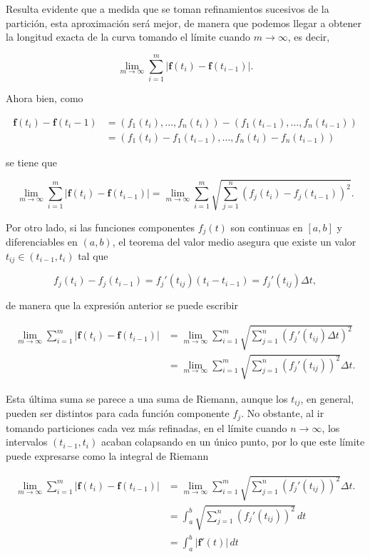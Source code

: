 \documentclass[
  a4paper,
]{scrreport}
\theoremstyle{definition}
\theoremstyle{plain}
\theoremstyle{plain}
\theoremstyle{definition}
\theoremstyle{plain}
\theoremstyle{remark}
\begin{document}
Resulta evidente que a medida que se toman refinamientos sucesivos de la
partición, esta aproximación será mejor, de manera que podemos llegar a
obtener la longitud exacta de la curva tomando el límite cuando
\(m\to\infty\), es decir,

\[
\lim_{m\to\infty}\sum_{i=1}^m |\mathbf{f}(t_i)-\mathbf{f}(t_{i-1})|.
\]

Ahora bien, como

\begin{align*}
\mathbf{f}(t_i)-\mathbf{f}(t_i-1) 
&= (f_1(t_i),\ldots,f_n(t_i))-(f_1(t_{i-1}),\ldots,f_n(t_{i-1})) \\
&= (f_1(t_i)-f_1(t_{i-1}),\ldots,f_n(t_i)-f_n(t_{i-1}))
\end{align*}

se tiene que

\[
\lim_{m\to\infty}\sum_{i=1}^m |\mathbf{f}(t_i)-\mathbf{f}(t_{i-1})| =
\lim_{m\to\infty}\sum_{i=1}^m \sqrt{\sum_{j=1}^n (f_j(t_i)-f_j(t_{i-1}))^2}.
\]

Por otro lado, si las funciones componentes \(f_j(t)\) son continuas en
\([a,b]\) y diferenciables en \((a,b)\), el teorema del valor medio
asegura que existe un valor \(t_{ij}\in(t_{i-1},t_i)\) tal que

\[
f_j(t_i)-f_j(t_{i-1}) = f_j'(t_{ij})(t_i-t_{i-1}) = f_j'(t_{ij}) \Delta t,
\]

de manera que la expresión anterior se puede escribir

\begin{align*}
\lim_{m\to\infty}\sum_{i=1}^m |\mathbf{f}(t_i)-\mathbf{f}(t_{i-1})| 
&= \lim_{m\to\infty}\sum_{i=1}^m \sqrt{\sum_{j=1}^n (f_j'(t_{ij})\Delta t)^2} \\
&= \lim_{m\to\infty}\sum_{i=1}^m \sqrt{\sum_{j=1}^n (f_j'(t_{ij}))^2}\Delta t.
\end{align*}

Esta última suma se parece a una suma de Riemann, aunque los \(t_{ij}\),
en general, pueden ser distintos para cada función componente \(f_j\).
No obstante, al ir tomando particiones cada vez más refinadas, en el
límite cuando \(n\to\infty\), los intervalos \((t_{i-1},t_i)\) acaban
colapsando en un único punto, por lo que este límite puede expresarse
como la integral de Riemann

\begin{align*}
\lim_{m\to\infty}\sum_{i=1}^m |\mathbf{f}(t_i)-\mathbf{f}(t_{i-1})| 
&= \lim_{m\to\infty}\sum_{i=1}^m \sqrt{\sum_{j=1}^n (f_j'(t_{ij}))^2}\Delta t. \\
&= \int_a^b \sqrt{\sum_{j=1}^n (f_j'(t_{ij}))^2}\, dt \\
&= \int_a^b |\mathbf{f}'(t)|\, dt
\end{align*}
\end{document}
